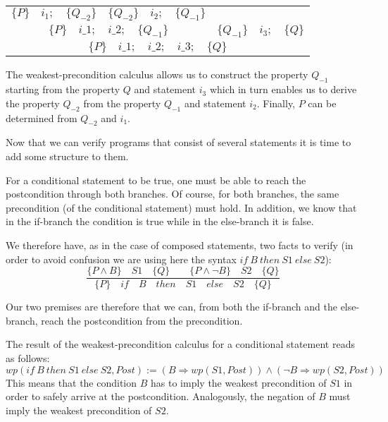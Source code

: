 \begin{center}
\begin{tabular}{ccc}
  $\{P\}\quad i_1 ; \quad \{Q_{-2}\}$ & $\{Q_{-2}\}\quad i_2 ; \quad \{Q_{-1}\}$ & \\
  \cline{1-2}
  \multicolumn{2}{c}{$\{P\}\quad i\_1 ; \quad i\_2 ; \quad \{Q_{-1}\}$} & $\{Q_{-1}\} \quad i_3 ; \quad \{Q\}$\\
  \hline
  \multicolumn{3}{c}{$\{P\}\quad i\_1 ; \quad i\_2 ; \quad i\_3; \quad \{ Q \}$}
\end{tabular}
\end{center}

The weakest-precondition calculus allows us to construct the property
$Q_{-1}$ starting from the property $Q$ and statement $i_3$ which
in turn enables us to derive the property $Q_{-2}$ from the property
$Q_{-1}$ and statement $i_2$. Finally, $P$ can be determined from
$Q_{-2}$ and $i_1$.



Now that we can verify programs that consist of several statements it
is time to add some structure to them.





For a conditional statement to be true, one must be able to reach the
postcondition through both branches. Of course, for both branches, the
same precondition (of the conditional statement) must hold. In addition,
we know that in the if-branch the condition is true while in the
else-branch it is false.

We therefore have, as in the case of composed statements, two facts to
verify (in order to avoid confusion we are using here the syntax
$if\ B\ then\ S1\ else\ S2$):
$$\dfrac{\{P \wedge B\}\quad S1\quad \{Q\} \quad \quad \{P \wedge \neg B\}\quad S2\quad \{Q\}}{\{P\}\quad if\quad B\quad then\quad S1\quad else\quad S2 \quad \{Q\}}$$

Our two premises are therefore that we can, from both the if-branch and the
else-branch, reach the postcondition from the precondition.

The result of the weakest-precondition calculus for a conditional
statement reads as follows:
$$wp(if\ B\ then\ S1\ else\ S2 , Post) := (B \Rightarrow wp(S1, Post)) \wedge (\neg B \Rightarrow wp(S2, Post))$$
This means that the condition $B$ has to imply the weakest
precondition of $S1$ in order to safely arrive at the postcondition.
Analogously, the negation of $B$ must imply the weakest precondition
of $S2$.



